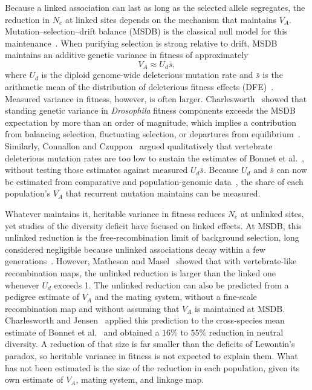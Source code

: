 \documentclass{article}
\begin{document}
Because a linked association can last as long as the selected allele segregates, the reduction in $N_e$ at linked sites depends on the mechanism that maintains $V_A$. Mutation--selection--drift balance (MSDB) is the classical null model for this maintenance~\cite{haldane1937,crow1970}. When purifying selection is strong relative to drift, MSDB maintains an additive genetic variance in fitness of approximately
\begin{equation}
    V_A \approx U_d \bar{s}, \label{eq:intro_mukai}
\end{equation}
where $U_d$ is the diploid genome-wide deleterious mutation rate and $\bar{s}$ is the arithmetic mean of the distribution of deleterious fitness effects (DFE)~\cite{mukai1972,charlesworth2015}. Measured variance in fitness, however, is often larger. Charlesworth~\cite{charlesworth2015} showed that standing genetic variance in \textit{Drosophila} fitness components exceeds the MSDB expectation by more than an order of magnitude, which implies a contribution from balancing selection, fluctuating selection, or departures from equilibrium~\cite{johnson2005,charlesworth2022}. Similarly, Connallon and Czuppon~\cite{connallon2026} argued qualitatively that vertebrate deleterious mutation rates are too low to sustain the estimates of Bonnet et al.~\cite{bonnet2022}, without testing those estimates against measured $U_d\bar{s}$. Because $U_d$ and $\bar{s}$ can now be estimated from comparative and population-genomic data~\cite{eyrewalker2007,huber2017,bergeron2023,lin2026}, the share of each population's $V_A$ that recurrent mutation maintains can be measured.

Whatever maintains it, heritable variance in fitness reduces $N_e$ at unlinked sites, yet studies of the diversity deficit have focused on linked effects. At MSDB, this unlinked reduction is the free-recombination limit of background selection, long considered negligible because unlinked associations decay within a few generations~\cite{charlesworth2012}. However, Matheson and Masel~\cite{matheson2024} showed that with vertebrate-like recombination maps, the unlinked reduction is larger than the linked one whenever $U_d$ exceeds 1. The unlinked reduction can also be predicted from a pedigree estimate of $V_A$ and the mating system, without a fine-scale recombination map and without assuming that $V_A$ is maintained at MSDB. Charlesworth and Jensen~\cite{charlesworth2022} applied this prediction to the cross-species mean estimate of Bonnet et al.~\cite{bonnet2022} and obtained a $16\%$ to $55\%$ reduction in neutral diversity. A reduction of that size is far smaller than the deficits of Lewontin's paradox, so heritable variance in fitness is not expected to explain them. What has not been estimated is the size of the reduction in each population, given its own estimate of $V_A$, mating system, and linkage map.
\end{document}
